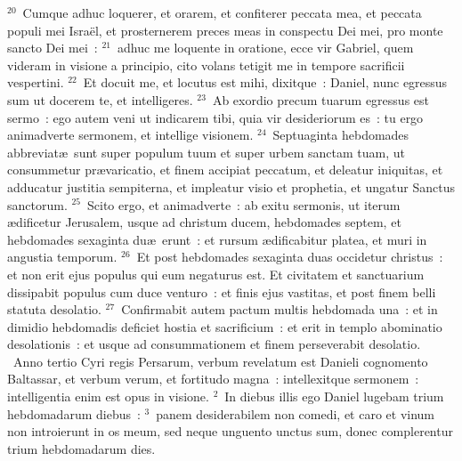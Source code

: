 ${}^{20}$~Cumque adhuc loquerer, et orarem, et confiterer peccata mea, et peccata populi mei Isra\"el, et prosternerem preces meas in conspectu Dei mei, pro monte sancto Dei mei~:
${}^{21}$~adhuc me loquente in oratione, ecce vir Gabriel, quem videram in visione a principio, cito volans tetigit me in tempore sacrificii vespertini.
${}^{22}$~Et docuit me, et locutus est mihi, dixitque~: Daniel, nunc egressus sum ut docerem te, et intelligeres.
${}^{23}$~Ab exordio precum tuarum egressus est sermo~: ego autem veni ut indicarem tibi, quia vir desideriorum es~: tu ergo animadverte sermonem, et intellige visionem.
${}^{24}$~Septuaginta hebdomades abbreviat\ae\ sunt super populum tuum et super urbem sanctam tuam, ut consummetur pr\ae varicatio, et finem accipiat peccatum, et deleatur iniquitas, et adducatur justitia sempiterna, et impleatur visio et prophetia, et ungatur Sanctus sanctorum.
${}^{25}$~Scito ergo, et animadverte~: ab exitu sermonis, ut iterum \ae dificetur Jerusalem, usque ad christum ducem, hebdomades septem, et hebdomades sexaginta du\ae\ erunt~: et rursum \ae dificabitur platea, et muri in angustia temporum.
${}^{26}$~Et post hebdomades sexaginta duas occidetur christus~: et non erit ejus populus qui eum negaturus est. Et civitatem et sanctuarium dissipabit populus cum duce venturo~: et finis ejus vastitas, et post finem belli statuta desolatio.
${}^{27}$~Confirmabit autem pactum multis hebdomada una~: et in dimidio hebdomadis deficiet hostia et sacrificium~: et erit in templo abominatio desolationis~: et usque ad consummationem et finem perseverabit desolatio.
~\lettrine[lines=10,image=true,loversize=0.05,lraise=-0.03]{A}{}nno tertio Cyri regis Persarum, verbum revelatum est Danieli cognomento Baltassar, et verbum verum, et fortitudo magna~: intellexitque sermonem~: intelligentia enim est opus in visione.
${}^{2}$~In diebus illis ego Daniel lugebam trium hebdomadarum diebus~:
${}^{3}$~panem desiderabilem non comedi, et caro et vinum non introierunt in os meum, sed neque unguento unctus sum, donec complerentur trium hebdomadarum dies.


